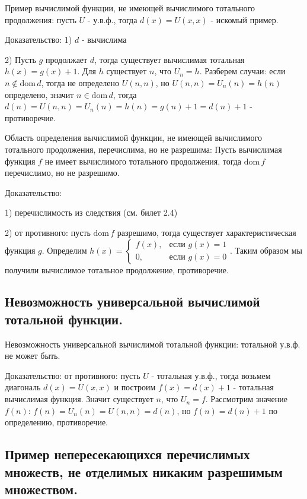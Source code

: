 \documentclass[a4paper, 10pt]{article}
\newcommand{\dom}{\text{dom}\,}
\begin{document}
Пример вычислимой функции, не имеющей вычислимого тотального продолжения: пусть $U$ - у.в.ф., тогда $d(x)=U(x,x)$ - искомый пример.

Доказательство: 1) $d$ - вычислима

2) Пусть $g$ продолжает $d$, тогда существует вычислимая тотальная $h(x)=g(x)+1$. Для $h$ существует $n$, что $U_n=h$. Разберем случаи: если $n\not\in\dom d$, тогда не определено $U(n,n)$, но $U(n,n)=U_n(n)=h(n)$ определено, значит $n\in\dom d$, тогда $d(n)=U(n,n)=U_n(n)=h(n)=g(n)+1=d(n)+1$ - противоречие.

\hfill

Область определения вычислимой функции, не имеющей вычислимого тотального продолжения, перечислима, но не разрешима: Пусть вычислимая функция $f$ не имеет вычислимого тотального продолжения, тогда $\dom f$ перечислимо, но не разрешимо.

Доказательство:

1) перечислимость из следствия (см. билет 2.4)

2) от противного: пусть $\dom f$ разрешимо, тогда существует характеристическая функция $g$. Определим $h(x)=\begin{cases}
    f(x),&\text{если }g(x)=1 \\ 0,&\text{если }g(x)=0
\end{cases}$. Таким образом мы получили вычислимое тотальное продолжение, противоречие.

\subsection{Невозможность универсальной вычислимой тотальной функции.}

Невозможность универсальной вычислимой тотальной функции: тотальной у.в.ф. не может быть.

Доказательство: от противного: пусть $U$ - тотальная у.в.ф., тогда возьмем диагональ $d(x)=U(x,x)$ и построим $f(x)=d(x)+1$ - тотальная вычислимая функция. Значит существует $n$, что $U_n=f$. Рассмотрим значение $f(n)$: $f(n)=U_n(n)=U(n,n)=d(n)$, но $f(n)=d(n)+1$ по определению, противоречие.

\subsection{Пример непересекающихся перечислимых множеств, не отделимых никаким разрешимым множеством.}
\end{document}
